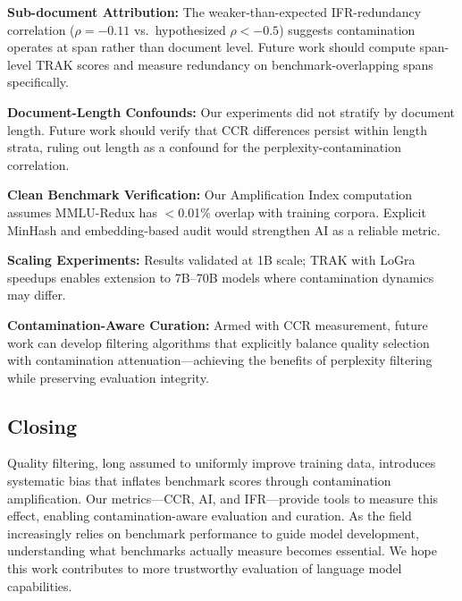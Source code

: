 \textbf{Sub-document Attribution:} The weaker-than-expected IFR-redundancy correlation ($\rho = -0.11$ vs.\ hypothesized $\rho < -0.5$) suggests contamination operates at span rather than document level. Future work should compute span-level TRAK scores and measure redundancy on benchmark-overlapping spans specifically.

\textbf{Document-Length Confounds:} Our experiments did not stratify by document length. Future work should verify that CCR differences persist within length strata, ruling out length as a confound for the perplexity-contamination correlation.

\textbf{Clean Benchmark Verification:} Our Amplification Index computation assumes MMLU-Redux has $<$0.01\% overlap with training corpora. Explicit MinHash and embedding-based audit would strengthen AI as a reliable metric.

\textbf{Scaling Experiments:} Results validated at 1B scale; TRAK with LoGra speedups enables extension to 7B--70B models where contamination dynamics may differ.

\textbf{Contamination-Aware Curation:} Armed with CCR measurement, future work can develop filtering algorithms that explicitly balance quality selection with contamination attenuation---achieving the benefits of perplexity filtering while preserving evaluation integrity.

\subsection{Closing}

Quality filtering, long assumed to uniformly improve training data, introduces systematic bias that inflates benchmark scores through contamination amplification. Our metrics---CCR, AI, and IFR---provide tools to measure this effect, enabling contamination-aware evaluation and curation. As the field increasingly relies on benchmark performance to guide model development, understanding what benchmarks actually measure becomes essential. We hope this work contributes to more trustworthy evaluation of language model capabilities.
